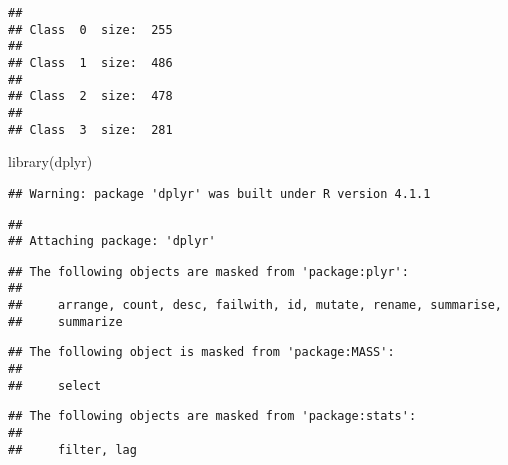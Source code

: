 \documentclass[
]{article}
\newenvironment{Shaded}{\begin{snugshade}}{\end{snugshade}}
\newcommand{\AttributeTok}[1]{\textcolor[rgb]{0.77,0.63,0.00}{#1}}
\newcommand{\CommentTok}[1]{\textcolor[rgb]{0.56,0.35,0.01}{\textit{#1}}}
\newcommand{\ControlFlowTok}[1]{\textcolor[rgb]{0.13,0.29,0.53}{\textbf{#1}}}
\newcommand{\DecValTok}[1]{\textcolor[rgb]{0.00,0.00,0.81}{#1}}
\newcommand{\FunctionTok}[1]{\textcolor[rgb]{0.00,0.00,0.00}{#1}}
\newcommand{\NormalTok}[1]{#1}
\newcommand{\SpecialCharTok}[1]{\textcolor[rgb]{0.00,0.00,0.00}{#1}}
\newcommand{\StringTok}[1]{\textcolor[rgb]{0.31,0.60,0.02}{#1}}
\begin{document}
\begin{Shaded}
\end{Shaded}

\begin{verbatim}
## 
## Class  0  size:  255 
## 
## Class  1  size:  486 
## 
## Class  2  size:  478 
## 
## Class  3  size:  281
\end{verbatim}

\begin{Shaded}
\begin{Highlighting}[]
\FunctionTok{library}\NormalTok{(dplyr)}
\end{Highlighting}
\end{Shaded}

\begin{verbatim}
## Warning: package 'dplyr' was built under R version 4.1.1
\end{verbatim}

\begin{verbatim}
## 
## Attaching package: 'dplyr'
\end{verbatim}

\begin{verbatim}
## The following objects are masked from 'package:plyr':
## 
##     arrange, count, desc, failwith, id, mutate, rename, summarise,
##     summarize
\end{verbatim}

\begin{verbatim}
## The following object is masked from 'package:MASS':
## 
##     select
\end{verbatim}

\begin{verbatim}
## The following objects are masked from 'package:stats':
## 
##     filter, lag
\end{verbatim}
\end{document}
